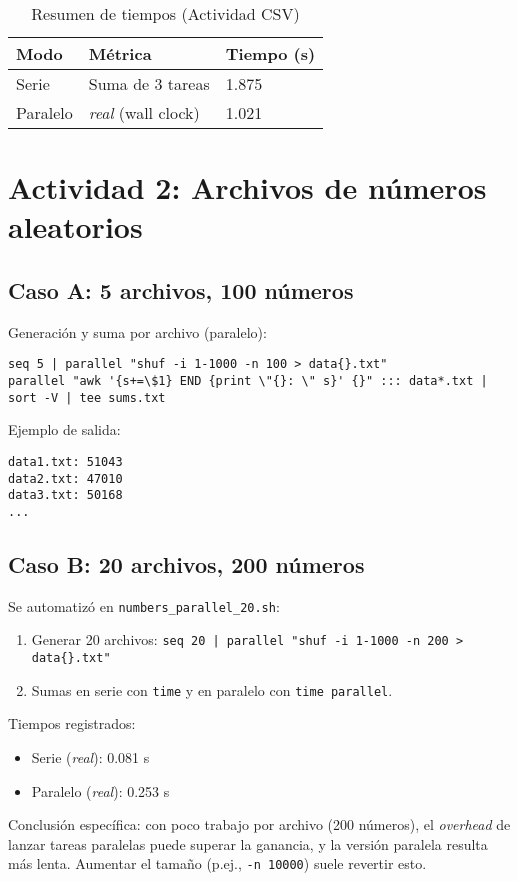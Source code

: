 \documentclass[11pt,a4paper]{article}
\newcommand{\code}[1]{\texttt{#1}}
\begin{document}
\begin{table}[h]
  \centering
  \caption{Resumen de tiempos (Actividad CSV)}
  \begin{tabular}{@{}lll@{}}
    \toprule
    Modo & Métrica & Tiempo (s) \\
    \midrule
    Serie    & Suma de 3 tareas & 1.875 \\
    Paralelo & \emph{real} (wall clock) & 1.021 \\
    \bottomrule
  \end{tabular}
\end{table}

\section{Actividad 2: Archivos de números aleatorios}
\subsection{Caso A: 5 archivos, 100 números}
Generación y suma por archivo (paralelo):
\begin{lstlisting}[style=cmd]
seq 5 | parallel "shuf -i 1-1000 -n 100 > data{}.txt"
parallel "awk '{s+=\$1} END {print \"{}: \" s}' {}" ::: data*.txt | sort -V | tee sums.txt
\end{lstlisting}
Ejemplo de salida:
\begin{lstlisting}[style=cmd]
data1.txt: 51043
data2.txt: 47010
data3.txt: 50168
...
\end{lstlisting}

\subsection{Caso B: 20 archivos, 200 números}
Se automatizó en \code{numbers\_parallel\_20.sh}:
\begin{enumerate}
  \item Generar 20 archivos: \code{seq 20 | parallel "shuf -i 1-1000 -n 200 > data\{\}.txt"}
  \item Sumas en serie con \code{time} y en paralelo con \code{time parallel}.
\end{enumerate}
Tiempos registrados:
\begin{itemize}
  \item Serie (\emph{real}): \SI{0.081}{} s
  \item Paralelo (\emph{real}): \SI{0.253}{} s
\end{itemize}
Conclusión específica: con poco trabajo por archivo (200 números), el \textit{overhead} de lanzar tareas paralelas puede superar la ganancia, y la versión paralela resulta más lenta. Aumentar el tamaño (p.ej., \code{-n 10000}) suele revertir esto.
\end{document}
